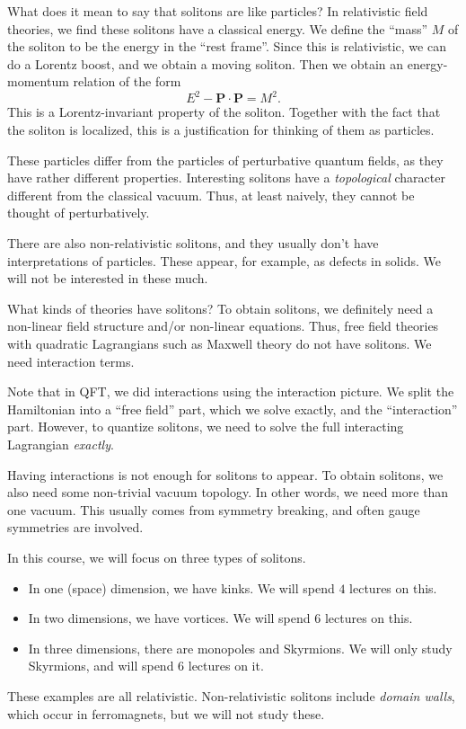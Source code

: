 \documentclass[a4paper]{article}
\begin{document}
What does it mean to say that solitons are like particles? In relativistic field theories, we find these solitons have a classical energy. We define the ``mass'' $M$ of the soliton to be the energy in the ``rest frame''. Since this is relativistic, we can do a Lorentz boost, and we obtain a moving soliton. Then we obtain an energy-momentum relation of the form
\[
  E^2 - \mathbf{P} \cdot \mathbf{P} = M^2.
\]
This is a Lorentz-invariant property of the soliton. Together with the fact that the soliton is localized, this is a justification for thinking of them as particles.

These particles differ from the particles of perturbative quantum fields, as they have rather different properties. Interesting solitons have a \emph{topological} character different from the classical vacuum. Thus, at least naively, they cannot be thought of perturbatively.

There are also non-relativistic solitons, and they usually don't have interpretations of particles. These appear, for example, as defects in solids. We will not be interested in these much.

What kinds of theories have solitons? To obtain solitons, we definitely need a non-linear field structure and/or non-linear equations. Thus, free field theories with quadratic Lagrangians such as Maxwell theory do not have solitons. We need interaction terms.

Note that in QFT, we did interactions using the interaction picture. We split the Hamiltonian into a ``free field'' part, which we solve exactly, and the ``interaction'' part. However, to quantize solitons, we need to solve the full interacting Lagrangian \emph{exactly}.

Having interactions is not enough for solitons to appear. To obtain solitons, we also need some non-trivial vacuum topology. In other words, we need more than one vacuum. This usually comes from symmetry breaking, and often gauge symmetries are involved.

In this course, we will focus on three types of solitons.
\begin{itemize}
  \item In one (space) dimension, we have kinks. We will spend $4$ lectures on this.

  \item In two dimensions, we have vortices. We will spend $6$ lectures on this.

  \item In three dimensions, there are monopoles and Skyrmions. We will only study Skyrmions, and will spend $6$ lectures on it.
\end{itemize}
These examples are all relativistic. Non-relativistic solitons include \emph{domain walls}, which occur in ferromagnets, but we will not study these.
\end{document}
